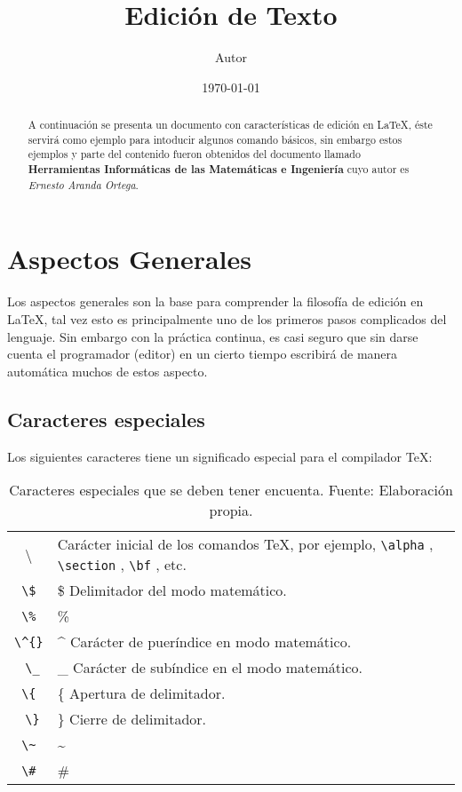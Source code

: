 \documentclass[11pt,letter]{article} %
\title{Edición de Texto}
\author{Autor}
\date{\today}
\begin{document}
%
\maketitle
%
%
%
%
\begin{abstract}
  A continuación se presenta un documento con características de edición en \LaTeX, éste servirá como ejemplo para intoducir algunos comando básicos, sin embargo estos ejemplos y parte del contenido fueron obtenidos del documento llamado \textbf{Herramientas Informáticas de las Matemáticas e Ingeniería} cuyo autor es \textit{Ernesto Aranda Ortega}.
\end{abstract}
%
%
\section{Aspectos Generales}
\label{sec:aspgenerales}
%
Los aspectos generales son la base para comprender la filosofía de edición en \LaTeX, tal vez esto es principalmente uno de los primeros pasos complicados del lenguaje. Sin embargo con la práctica continua, es casi seguro que sin darse cuenta el programador (editor) en un cierto tiempo escribirá de manera automática muchos de estos aspecto.
%
\subsection{Caracteres especiales}
\label{sec:caracteresesp}

Los siguientes caracteres tiene un significado especial para el compilador \TeX:

\begin{table}[H]
  \centering
  \begin{tabular}{cl}
    \textbackslash   & Carácter inicial de los comandos \TeX, por ejemplo, \verb|\alpha| , \verb|\section| , \verb|\bf| , etc. \\
    \verb|\$|  & \$ Delimitador del modo matemático. \\
    \verb|\%|  & \% \\
    \verb|\^{}|  & \^{} Carácter de pueríndice en modo matemático.\\
    \verb| \_|  & \_ Carácter de subíndice en el modo matemático. \\
    \verb|\{|  & \{ Apertura de delimitador. \\
    \verb| \}|  & \}  Cierre de delimitador. \\
    \verb|\~|  & \~{} \\
    \verb|\#|  & \# \\
  \end{tabular}
  \caption{Caracteres especiales que se deben tener encuenta. Fuente: Elaboración propia.}
\end{table}
\end{document}
